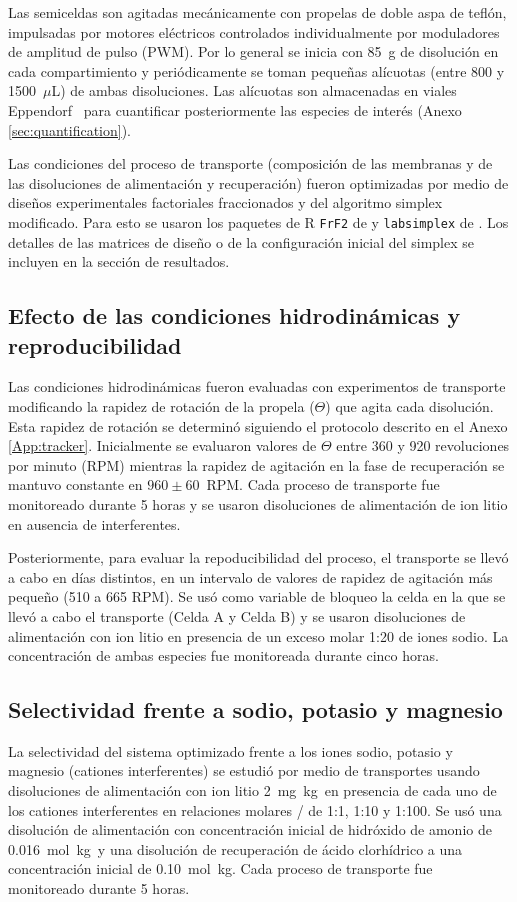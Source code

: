 Las semiceldas son agitadas mecánicamente con propelas de doble aspa de teflón, impulsadas por motores eléctricos controlados individualmente por moduladores de amplitud de pulso (\acs{PWM}). Por lo general se inicia con 85~g de disolución en cada compartimiento y periódicamente se toman pequeñas alícuotas (entre 800 y 1500~$\mu$L) de ambas disoluciones. Las alícuotas son almacenadas en viales Eppendorf\textregistered~ para cuantificar posteriormente las especies de interés (Anexo \ref{sec:quantification}).

Las condiciones del proceso de transporte (composición de las membranas y de las disoluciones de alimentación y recuperación) fueron optimizadas por medio de diseños experimentales factoriales fraccionados y del algoritmo simplex modificado. Para esto se usaron los paquetes de R \verb|FrF2| de \cite{FrF2} y \verb|labsimplex| de \cite{labsimplex}. Los detalles de las matrices de diseño o de la configuración inicial del simplex se incluyen en la sección de resultados.

\subsection{Efecto de las condiciones hidrodinámicas y reproducibilidad}\label{sec:hydroexpe}
Las condiciones hidrodinámicas fueron evaluadas con experimentos de transporte modificando la rapidez de rotación de la propela ($\Theta$) que agita cada disolución. Esta rapidez de rotación se determinó siguiendo el protocolo descrito en el Anexo \ref{App:tracker}. Inicialmente se evaluaron valores de $\Theta$ entre 360 y 920 revoluciones por minuto (\ac{RPM}) mientras la rapidez de agitación en la fase de recuperación se mantuvo constante en $960\pm60$~\ac{RPM}. Cada proceso de transporte fue monitoreado durante 5 horas y se usaron disoluciones de alimentación de ion litio en ausencia de interferentes.

Posteriormente, para evaluar la repoducibilidad del proceso, el transporte se llevó a cabo en días distintos, en un intervalo de valores de rapidez de agitación más pequeño (510 a 665 \ac{RPM}). Se usó como variable de bloqueo la celda en la que se llevó a cabo el transporte (Celda A y Celda B) y se usaron disoluciones de alimentación con ion litio en presencia de un exceso molar 1:20 de iones sodio. La concentración de ambas especies fue monitoreada durante cinco horas.

\subsection{Selectividad frente a sodio, potasio y magnesio}
La selectividad del sistema optimizado frente a los iones sodio, potasio y magnesio (cationes interferentes) se estudió por medio de transportes usando disoluciones de alimentación con ion litio 2~mg~kg\mnn\ en presencia de cada uno de los cationes interferentes en relaciones molares / de 1:1, 1:10 y 1:100. Se usó una disolución de alimentación con concentración inicial de hidróxi\-do de amonio de 0.016~mol~kg\mnn\ y una disolución de recuperación de ácido clorhídrico a una concentración inicial de 0.10~mol~kg\mnn. Cada proceso de transporte fue monitoreado durante 5 horas.

